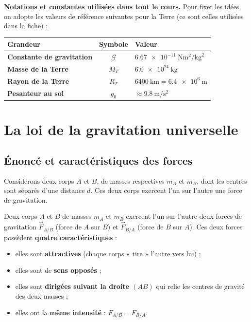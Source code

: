 \documentclass[11pt,a4paper]{article}
\newcommand{\vv}[1]{\vec{#1}}
\newcommand{\Grav}{\mathcal{G}}        %
\begin{document}
\noindent\textbf{Notations et constantes utilisées dans tout le cours.}
Pour fixer les idées, on adopte les valeurs de référence suivantes pour la Terre
(ce sont celles utilisées dans la fiche) :

\begin{center}
\renewcommand{\arraystretch}{1.3}
\begin{tabular}{>{\bfseries}l c l}
\toprule
Grandeur & Symbole & Valeur \\
\midrule
Constante de gravitation & $\Grav$ & $\SI{6.67e-11}{\newton\metre\squared\per\kilogram\squared}$ \\
Masse de la Terre & $M_T$ & $\SI{6.0e24}{\kilogram}$ \\
Rayon de la Terre & $R_T$ & $\SI{6400}{\kilo\metre}=\SI{6.4e6}{\metre}$ \\
Pesanteur au sol & $g_0$ & $\approx \SI{9.8}{\metre\per\second\squared}$ \\
\bottomrule
\end{tabular}
\end{center}

\section{La loi de la gravitation universelle}

\subsection{Énoncé et caractéristiques des forces}

Considérons deux corps $A$ et $B$, de masses respectives $m_A$ et $m_B$, dont les
centres sont séparés d'une distance $d$. Ces deux corps exercent l'un sur l'autre
une force de gravitation.

\begin{definition}
Deux corps $A$ et $B$ de masses $m_A$ et $m_B$ exercent l'un sur l'autre deux forces
de gravitation $\vv F_{A/B}$ (force de $A$ sur $B$) et $\vv F_{B/A}$ (force de $B$ sur $A$).
Ces deux forces possèdent \textbf{quatre caractéristiques} :
\begin{itemize}[leftmargin=1.6em,topsep=2pt,itemsep=1pt]
  \item elles sont \textbf{attractives} (chaque corps « tire » l'autre vers lui) ;
  \item elles sont de \textbf{sens opposés} ;
  \item elles sont \textbf{dirigées suivant la droite $(AB)$} qui relie les centres
        de gravité des deux masses ;
  \item elles ont la \textbf{même intensité} : $F_{A/B}=F_{B/A}$.
\end{itemize}
\end{definition}
\end{document}
